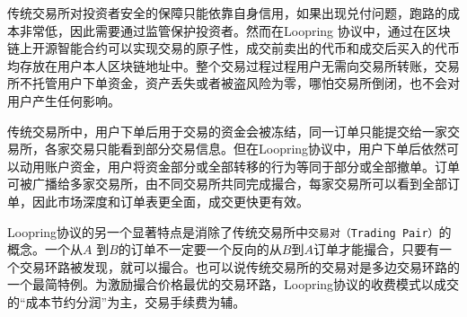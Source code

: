 \documentclass[UTF8,nofonts]{ctexart}
\begin{document}
传统交易所对投资者安全的保障只能依靠自身信用，如果出现兑付问题，跑路的成本非常低，因此需要通过监管保护投资者。然而在Loopring 协议中，通过在区块链上开源智能合约可以实现交易的原子性，成交前卖出的代币和成交后买入的代币均存放在用户本人区块链地址中。整个交易过程过程用户无需向交易所转账，交易所不托管用户下单资金，资产丢失或者被盗风险为零，哪怕交易所倒闭，也不会对用户产生任何影响。


传统交易所中，用户下单后用于交易的资金会被冻结，同一订单只能提交给一家交易所，各家交易只能看到部分交易信息。但在Loopring协议中，用户下单后依然可以动用账户资金，用户将资金部分或全部转移的行为等同于部分或全部撤单。订单可被广播给多家交易所，由不同交易所共同完成撮合，每家交易所可以看到全部订单，因此市场深度和订单表更全面，成交更快更有效。

Loopring协议的另一个显著特点是消除了传统交易所中\texttt{交易对（Trading Pair）}的概念。一个从$A$ 到$B$的订单不一定要一个反向的从$B$到$A$订单才能撮合，只要有一个交易环路被发现，就可以撮合。也可以说传统交易所的交易对是多边交易环路的一个最简特例。为激励撮合价格最优的交易环路，Loopring协议的收费模式以成交的“成本节约分润”为主，交易手续费为辅。
\end{document}

